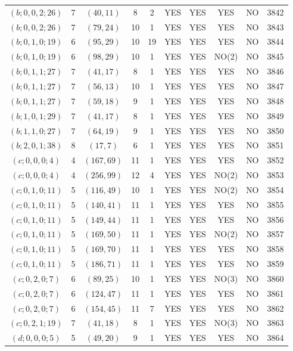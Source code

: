 \begin{longtable}{|c|c|c|c|c|c|c|c|c|c|}
$(b; 0, 0, 2; 26)$ & 7 & $(40, 11)$ & 8 & 2 & YES & YES & YES & NO & 3842\\
$(b; 0, 0, 2; 26)$ & 7 & $(79, 24)$ & 10 & 1 & YES & YES & YES & NO & 3843\\
$(b; 0, 1, 0; 19)$ & 6 & $(95, 29)$ & 10 & 19 & YES & YES & YES & NO & 3844\\
$(b; 0, 1, 0; 19)$ & 6 & $(98, 29)$ & 10 & 1 & YES & YES & NO(2) & NO & 3845\\
$(b; 0, 1, 1; 27)$ & 7 & $(41, 17)$ & 8 & 1 & YES & YES & YES & NO & 3846\\
$(b; 0, 1, 1; 27)$ & 7 & $(56, 13)$ & 10 & 1 & YES & YES & YES & NO & 3847\\
$(b; 0, 1, 1; 27)$ & 7 & $(59, 18)$ & 9 & 1 & YES & YES & YES & NO & 3848\\
$(b; 1, 0, 1; 29)$ & 7 & $(41, 17)$ & 8 & 1 & YES & YES & YES & NO & 3849\\
$(b; 1, 1, 0; 27)$ & 7 & $(64, 19)$ & 9 & 1 & YES & YES & YES & NO & 3850\\
$(b; 2, 0, 1; 38)$ & 8 & $(17, 7)$ & 6 & 1 & YES & YES & YES & NO & 3851\\
$(c; 0, 0, 0; 4)$ & 4 & $(167, 69)$ & 11 & 1 & YES & YES & YES & NO & 3852\\
$(c; 0, 0, 0; 4)$ & 4 & $(256, 99)$ & 12 & 4 & YES & YES & NO(2) & NO & 3853\\
$(c; 0, 1, 0; 11)$ & 5 & $(116, 49)$ & 10 & 1 & YES & YES & NO(2) & NO & 3854\\
$(c; 0, 1, 0; 11)$ & 5 & $(140, 41)$ & 11 & 1 & YES & YES & YES & NO & 3855\\
$(c; 0, 1, 0; 11)$ & 5 & $(149, 44)$ & 11 & 1 & YES & YES & YES & NO & 3856\\
$(c; 0, 1, 0; 11)$ & 5 & $(169, 50)$ & 11 & 1 & YES & YES & NO(2) & NO & 3857\\
$(c; 0, 1, 0; 11)$ & 5 & $(169, 70)$ & 11 & 1 & YES & YES & YES & NO & 3858\\
$(c; 0, 1, 0; 11)$ & 5 & $(186, 71)$ & 11 & 1 & YES & YES & YES & NO & 3859\\
$(c; 0, 2, 0; 7)$ & 6 & $(89, 25)$ & 10 & 1 & YES & YES & NO(3) & NO & 3860\\
$(c; 0, 2, 0; 7)$ & 6 & $(124, 47)$ & 11 & 1 & YES & YES & YES & NO & 3861\\
$(c; 0, 2, 0; 7)$ & 6 & $(154, 45)$ & 11 & 7 & YES & YES & YES & NO & 3862\\
$(c; 0, 2, 1; 19)$ & 7 & $(41, 18)$ & 8 & 1 & YES & YES & NO(3) & NO & 3863\\
$(d; 0, 0, 0; 5)$ & 5 & $(49, 20)$ & 9 & 1 & YES & YES & YES & NO & 3864\\

\end{longtable}

